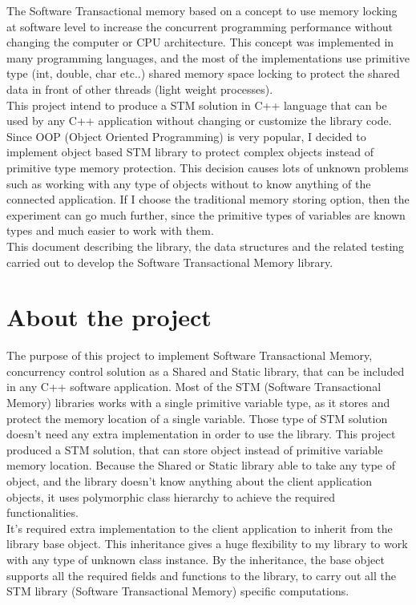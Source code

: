 \documentclass[12pt]{article}
\begin{document}
The Software Transactional memory based on a concept to use memory locking at software level to increase the concurrent programming performance without changing the computer or CPU architecture. This concept was implemented in many programming languages, and the most of the implementations use primitive type (int, double, char etc..) shared memory space locking to protect the shared data in front of other threads (light weight processes).\\

This project intend to produce a STM solution in C++ language that can be used by any C++ application without changing or customize the library code. Since OOP (Object Oriented Programming) is very popular, I decided to implement object based STM library to protect complex objects instead of primitive type memory protection. This decision causes lots of unknown problems such as working with any type of objects without to know anything of the connected application. If I choose the traditional memory storing option, then the experiment can go much further, since the primitive types of variables are known types and much easier to work with them.\\     

This document describing the library, the data structures and the related testing carried out to develop the Software Transactional Memory library.   

  
\section{About the project}
The purpose of this project to implement Software Transactional Memory, concurrency control solution as a Shared and Static library, that can be included in any C++ software application. Most of the STM (Software Transactional Memory) libraries works with a single primitive variable type, as it stores and protect the memory location of a single variable. Those type of STM solution doesn't need any extra implementation in order to use the library. This project produced a STM solution, that can store object instead of primitive variable memory location. Because the Shared or Static library able to take any type of object, and the library doesn't know anything about the client application objects, it uses polymorphic class hierarchy to achieve the required functionalities.\\

It's required extra implementation to the client application to inherit from the library base object. This inheritance gives a huge flexibility to my library to work with any type of unknown class instance. By the inheritance, the base object supports all the required fields and functions to the library, to carry out all the STM library (Software Transactional Memory) specific computations.\\
\end{document}
